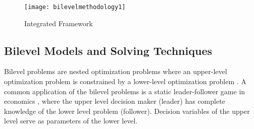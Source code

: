\documentclass[12pt]{article}
\begin{document}
\begin{figure}[ht]
\centering
\texttt{[image: bilevelmethodology1]}
\caption{Integrated Framework}
\label{plot:graph2_2}
\end{figure}

\subsection{Bilevel Models and Solving Techniques}
Bilevel problems are nested optimization problems where an upper-level optimization problem is constrained by a lower-level optimization problem \cite{Bard1998PracticalBO}. A common application of the bilevel problems is a static leader-follower game in economics \cite{Stackelberg}, where the upper level decision maker (leader) has complete knowledge of the lower level problem (follower). Decision variables of the upper level serve as parameters of the lower level. 
\end{document}
